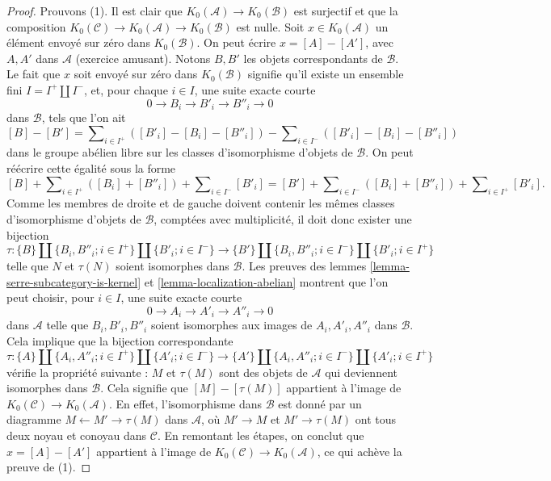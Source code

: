 \begin{proof}
Prouvons (1). Il est clair que $K_0(\mathcal{A}) \to K_0(\mathcal{B})$
est surjectif et que la composition $K_0(\mathcal{C}) \to
K_0(\mathcal{A}) \to K_0(\mathcal{B})$ est nulle. Soit $x \in K_0(\mathcal{A})$
un élément envoyé sur zéro dans $K_0(\mathcal{B})$. On peut écrire
$x = [A] - [A']$, avec $A, A'$ dans $\mathcal{A}$ (exercice amusant).
Notons $B, B'$ les objets correspondants de $\mathcal{B}$. Le fait que
$x$ soit envoyé sur zéro dans $K_0(\mathcal{B})$
signifie qu'il existe un ensemble fini $I = I^+ \amalg I^{-}$,
et, pour chaque $i \in I$, une suite exacte courte
$$
0 \to B_i \to B'_i \to B''_i \to 0
$$
dans $\mathcal{B}$, tels que l'on ait
$$
[B] - [B'] = \sum\nolimits_{i \in I^{+}} ([B'_i] - [B_i] - [B''_i])
-
\sum\nolimits_{i \in I^{-}} ([B'_i] - [B_i] - [B''_i])
$$
dans le groupe abélien libre sur les classes d'isomorphisme d'objets de $\mathcal{B}$.
On peut réécrire cette égalité sous la forme
$$
[B]
+ \sum\nolimits_{i \in I^{+}} ([B_i] + [B''_i])
+ \sum\nolimits_{i \in I^{-}} [B'_i]
=
[B']
+ \sum\nolimits_{i \in I^{-}} ([B_i] + [B''_i])
+ \sum\nolimits_{i \in I^{+}} [B'_i].
$$
Comme les membres de droite et de gauche doivent contenir les mêmes classes d'isomorphisme
d'objets de $\mathcal{B}$, comptées avec multiplicité, il doit donc
exister une bijection
$$
\tau :
\{B\} \amalg \{B_i, B''_i; i \in I^+\} \amalg \{B'_i; i \in I^-\}
\longrightarrow
\{B'\} \amalg \{B_i, B''_i; i \in I^-\} \amalg \{B'_i; i \in I^+\}
$$
telle que $N$ et $\tau(N)$ soient isomorphes dans $\mathcal{B}$.
Les preuves des lemmes \ref{lemma-serre-subcategory-is-kernel} et
\ref{lemma-localization-abelian} montrent que l'on peut choisir, pour $i \in I$,
une suite exacte courte
$$
0 \to A_i \to A'_i \to A''_i \to 0
$$
dans $\mathcal{A}$ telle que $B_i, B'_i, B''_i$ soient isomorphes aux
images de $A_i, A'_i, A''_i$ dans $\mathcal{B}$. Cela implique que la
bijection correspondante
$$
\tau :
\{A\} \amalg \{A_i, A''_i; i \in I^+\} \amalg \{A'_i; i \in I^-\}
\longrightarrow
\{A'\} \amalg \{A_i, A''_i; i \in I^-\} \amalg \{A'_i; i \in I^+\}
$$
vérifie la propriété suivante : $M$ et $\tau(M)$ sont des objets de $\mathcal{A}$
qui deviennent isomorphes dans $\mathcal{B}$. Cela signifie que $[M] - [\tau(M)]$
appartient à l'image de $K_0(\mathcal{C}) \to K_0(\mathcal{A})$. En effet,
l'isomorphisme dans $\mathcal{B}$ est donné par un diagramme
$M \leftarrow M' \rightarrow \tau(M)$ dans $\mathcal{A}$, où
$M' \to M$ et $M' \to \tau(M)$ ont tous deux noyau et conoyau dans $\mathcal{C}$.
En remontant les étapes, on conclut que $x = [A] - [A']$ appartient à l'image
de $K_0(\mathcal{C}) \to K_0(\mathcal{A})$, ce qui achève la preuve de (1).


\end{proof}
